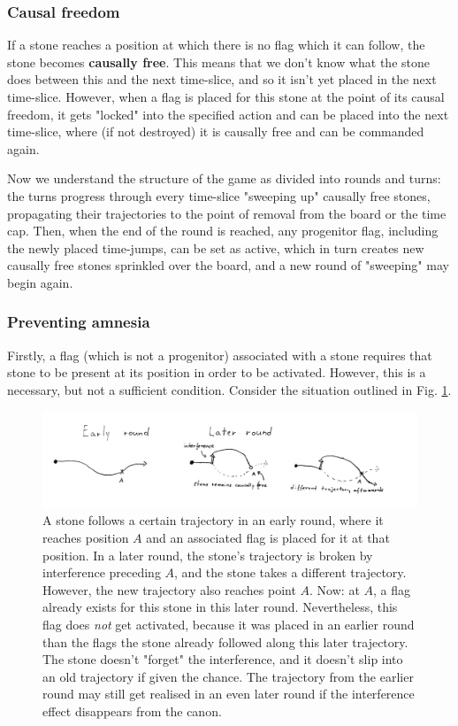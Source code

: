 \documentclass[12pt]{article}
\begin{document}
	\subsubsection{Causal freedom}\label{sec:causal freedom}
	If a stone reaches a position at which there is no flag which it can follow, the stone becomes \textbf{causally free}. This means that we don't know what the stone does between this and the next time-slice, and so it isn't yet placed in the next time-slice. However, when a flag is placed for this stone at the point of its causal freedom, it gets "locked" into the specified action and can be placed into the next time-slice, where (if not destroyed) it is causally free and can be commanded again.
	
	Now we understand the structure of the game as divided into rounds and turns: the turns progress through every time-slice "sweeping up" causally free stones, propagating their trajectories to the point of removal from the board or the time cap. Then, when the end of the round is reached, any progenitor flag, including the newly placed time-jumps, can be set as active, which in turn creates new causally free stones sprinkled over the board, and a new round of "sweeping" may begin again.
	
	\subsubsection{Preventing amnesia}\label{sec:flag activation conditions}
	Firstly, a flag (which is not a progenitor) associated with a stone requires that stone to be present at its position in order to be activated. However, this is a necessary, but not a sufficient condition. Consider the situation outlined in Fig. \ref{fig:amnesia}.
	
\begin{figure}[h]
\begin{center}
    \includegraphics[width=1\textwidth]{images/diag_amnesia}
 \caption{A stone follows a certain trajectory in an early round, where it reaches position $A$ and an associated flag is placed for it at that position. In a later round, the stone's trajectory is broken by interference preceding $A$, and the stone takes a different trajectory. However, the new trajectory also reaches point $A$. Now: at $A$, a flag already exists for this stone in this later round. Nevertheless, this flag does \textit{not} get activated, because it was placed in an earlier round than the flags the stone already followed along this later trajectory. The stone doesn't "forget" the interference, and it doesn't slip into an old trajectory if given the chance. The trajectory from the earlier round may still get realised in an even later round if the interference effect disappears from the canon.}\label{fig:amnesia}
\end{center}
\end{figure}
	
\end{document}

